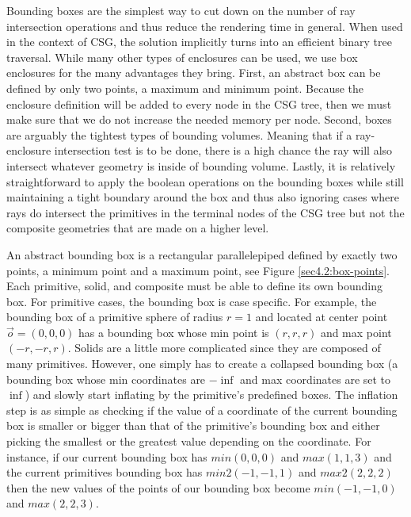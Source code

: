 \documentclass[a4paper,11pt,oneside]{article}
\begin{document}
Bounding boxes are the simplest way to cut down on the number of ray intersection operations and thus reduce the rendering time in general. When used in the context of CSG, the solution implicitly turns into an efficient binary tree traversal. While many other types of enclosures can be used, we use box enclosures for the many advantages they bring. First, an abstract box can be defined by only two points, a maximum and minimum point. Because the enclosure definition will be added to every node in the CSG tree, then we must make sure that we do not increase the needed memory per node. Second, boxes are arguably the tightest types of bounding volumes. Meaning that if a ray-enclosure intersection test is to be done, there is a high chance the ray will also intersect whatever geometry is inside of bounding volume. Lastly, it is relatively straightforward to apply the boolean operations on the bounding boxes while still maintaining a tight boundary around the box and thus also ignoring cases where rays do intersect the primitives in the terminal nodes of the CSG tree but not the composite geometries that are made on a higher level. 

An abstract bounding box is a rectangular parallelepiped defined by exactly two points, a minimum point and a maximum point, see Figure \ref{sec4.2:box-points}. Each primitive, solid, and composite must be able to define its own bounding box. For primitive cases, the bounding box is case specific. For example, the bounding box of a primitive sphere of radius $r = 1$ and located at center point $\vec{o} = (0, 0, 0)$ has a bounding box whose min point is $(r, r, r)$ and max point $(-r, -r, r)$. Solids are a little more complicated since they are composed of many primitives. However, one simply has to create a collapsed bounding box (a bounding box whose min coordinates are $-\inf$ and max coordinates are set to $\inf$) and slowly start inflating by the primitive's predefined boxes. The inflation step is as simple as checking if the value of  a coordinate of the current bounding box is smaller or bigger than that of the primitive's bounding box and either picking the smallest or the greatest value depending on the coordinate. For instance, if our current bounding box has $min(0, 0, 0)$ and $max(1, 1, 3)$ and the current primitives bounding box has $min2(-1, -1, 1)$ and $max2(2, 2, 2)$ then the new values of the points of our bounding box become $min(-1, -1, 0)$ and $max(2, 2, 3)$.
\end{document}
